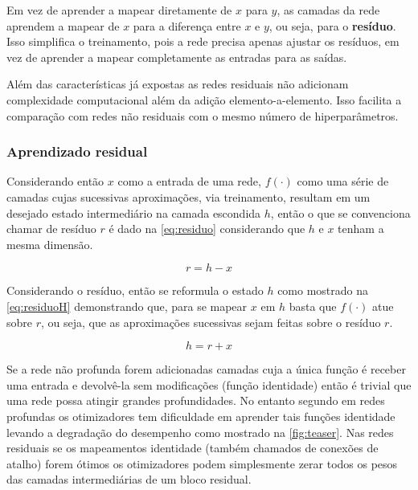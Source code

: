 			\par Em vez de aprender a mapear diretamente de $x$ para $y$, as camadas da rede aprendem a mapear de $x$ para a diferença entre $x$ e $y$, ou seja, para o \textbf{resíduo}. Isso simplifica o treinamento, pois a rede precisa apenas ajustar os resíduos, em vez de aprender a mapear completamente as entradas para as saídas.
			
			\par Além das características já expostas as redes residuais não adicionam complexidade computacional além da adição elemento-a-elemento. Isso facilita a comparação com redes não residuais com o mesmo número de hiperparâmetros.
			
			\subsubsection{Aprendizado residual}
			
				\par Considerando então $x$ como a entrada de uma rede, $f(\cdot)$ como uma série de camadas cujas sucessivas aproximações, via treinamento, resultam em um desejado  estado intermediário na camada escondida $h$, então o que se convenciona chamar de resíduo $r$ é dado na \autoref{eq:residuo} considerando que $h$ e $x$ tenham a mesma dimensão.
				
				
				\begin{equation}
					\label{eq:residuo}
					r = h - x
				\end{equation}
			
				\par Considerando o resíduo, então se  reformula o estado $h$ como mostrado na \autoref{eq:residuoH} demonstrando que, para se mapear $x$ em $h$ basta que $f(\cdot)$ atue sobre $r$, ou seja, que as aproximações sucessivas sejam feitas sobre o resíduo $r$.
				
				\begin{equation}
					\label{eq:residuoH}
					h = r + x
				\end{equation}
			
				\par Se a rede não profunda forem adicionadas camadas cuja a única função é receber uma entrada e devolvê-la sem modificações (função identidade) então é trivial que uma rede possa atingir grandes profundidades. No entanto segundo \cite{DBLP:journals/corr/HeZRS15} em redes profundas os otimizadores tem dificuldade em aprender tais funções identidade levando a degradação do desempenho como mostrado na \autoref{fig:teaser}. Nas redes residuais se os mapeamentos identidade (também chamados de conexões de atalho) forem ótimos os otimizadores podem simplesmente zerar todos os pesos das camadas intermediárias de um bloco residual.
				

